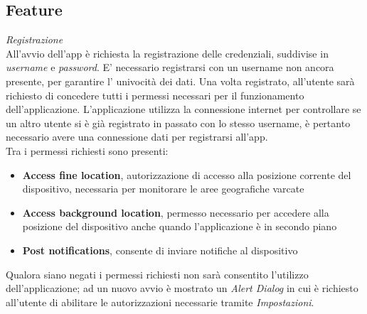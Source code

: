 \documentclass{article}
\begin{document}
    \newpage
    \subsection*{Feature}
    \textit{Registrazione} \vspace*{7pt}\\
    All'avvio dell'app è richiesta la registrazione delle credenziali, suddivise in \textit{username} e \textit{password}. E' necessario registrarsi con un username non ancora presente, per garantire l' univocità dei dati. Una volta registrato, all'utente sarà richiesto di concedere tutti i permessi necessari per il funzionamento dell'applicazione. L'applicazione utilizza la connessione internet per controllare se un altro utente si è già registrato in passato con lo stesso username, è pertanto necessario avere una connessione dati per registrarsi all'app.\\
    Tra i permessi richiesti sono presenti:
    \begin{itemize}
        \renewcommand{\labelitemi}{-}
        \item \textbf{Access fine location}, autorizzazione di accesso alla posizione corrente del dispositivo, necessaria per monitorare le aree geografiche varcate
        \item \textbf{Access background location}, permesso necessario per accedere alla posizione del dispositivo anche quando l'applicazione è in secondo piano
        \item \textbf{Post notifications}, consente di inviare notifiche al dispositivo
    \end{itemize}
    Qualora siano negati i permessi richiesti non sarà consentito l'utilizzo dell'applicazione; ad un nuovo avvio è mostrato un \textit{Alert Dialog} in cui è richiesto all'utente di abilitare le autorizzazioni necessarie tramite \textit{Impostazioni}. \vspace*{7pt}\\
\end{document}
